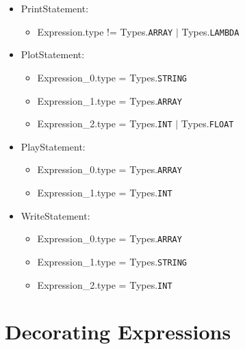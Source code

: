 \begin{itemize}
	\item PrintStatement:
		\begin{itemize}
			\item Expression.type != Types.\texttt{ARRAY} $|$ Types.\texttt{LAMBDA}
		\end{itemize}
	\item PlotStatement:
		\begin{itemize}
			\item Expression\_0.type = Types.\texttt{STRING}
			\item Expression\_1.type = Types.\texttt{ARRAY}
			\item Expression\_2.type = Types.\texttt{INT} $|$ Types.\texttt{FLOAT}
		\end{itemize}
	\item PlayStatement:
		\begin{itemize}
			\item Expression\_0.type = Types.\texttt{ARRAY}
			\item Expression\_1.type = Types.\texttt{INT}
		\end{itemize}
	\item WriteStatement:
		\begin{itemize}
			\item Expression\_0.type = Types.\texttt{ARRAY}
			\item Expression\_1.type = Types.\texttt{STRING}
			\item Expression\_2.type = Types.\texttt{INT}
		\end{itemize}
\end{itemize}

\section{Decorating Expressions}

